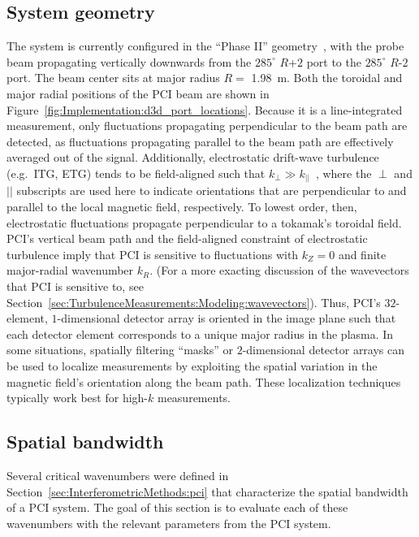 \subsection{System geometry}
\label{sec:Implementation:PCI:geometry}
The system is currently configured
in the ``Phase II'' geometry~\cite{dorris_rsi09},
with the probe beam propagating vertically downwards
from the $285^{\circ}$ {$R$+$2$} port to the $285^{\circ}$ {$R$-$2$} port.
The beam center sits at major radius $R = $ \SI{1.98}{\meter}.
Both the toroidal and major radial positions
of the PCI beam are shown in
Figure~\ref{fig:Implementation:d3d_port_locations}.
Because it is a line-integrated measurement,
only fluctuations propagating perpendicular to the beam path are detected,
as fluctuations propagating parallel to the beam path
are effectively averaged out of the signal.
Additionally, electrostatic drift-wave turbulence (e.g.\ ITG, ETG)
tends to be field-aligned
such that $k_{\perp} \gg k_{||}$~\cite{horton_drift_waves, tynan_ppcf09},
where the $\perp$ and $||$ subscripts are used here to indicate
orientations that are perpendicular to and parallel to
the local magnetic field, respectively.
To lowest order, then, electrostatic fluctuations propagate
perpendicular to a tokamak's toroidal field.
PCI's vertical beam path and
the field-aligned constraint of electrostatic turbulence
imply that PCI is sensitive to fluctuations
with $k_Z = 0$ and finite major-radial wavenumber $k_R$.
(For a more exacting discussion
of the wavevectors that PCI is sensitive to,
see Section~\ref{sec:TurbulenceMeasurements:Modeling:wavevectors}).
Thus, PCI's $32$-element, $1$-dimensional detector array
is oriented in the image plane such that
each detector element corresponds to a unique major radius in the plasma.
In some situations, spatially filtering ``masks''
\cite{dorris_rsi09, dorris_phd, lin_rsi06} or
$2$-dimensional detector arrays
\cite{sanin_rsi04, tanaka_rsi16}
can be used to localize measurements
by exploiting the spatial variation
in the magnetic field's orientation along the beam path.
These localization techniques typically work best
for high-$k$ measurements.


\subsection{Spatial bandwidth}
\label{sec:Implementation:PCI:spatial_bandwidth}
Several critical wavenumbers were defined in
Section~\ref{sec:InterferometricMethods:pci} that
characterize the spatial bandwidth of a PCI system.
The goal of this section is to evaluate each of these
wavenumbers with the relevant parameters from
the \diiid \space PCI system.

